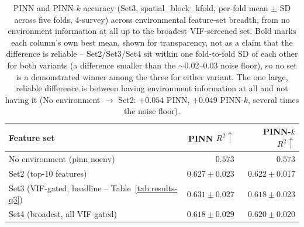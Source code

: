 
\begin{table}[!htbp]
\centering
\small
\setlength{\tabcolsep}{6pt}
\renewcommand{\arraystretch}{1.2}
\begin{tabular}{lrr}
\toprule
Feature set & PINN $R^2{\uparrow}$ & PINN-$k$ $R^2{\uparrow}$ \\
\midrule
No environment ($\text{pinn\_noenv}$) & $0.573$ & $0.573$ \\
Set2 (top-10 features) & $0.627{\pm}0.023$ & $0.622{\pm}0.017$ \\
Set3 (VIF-gated, headline -- Table~\ref{tab:results-q3}) & $\mathbf{0.631{\pm}0.027}$ & $0.618{\pm}0.023$ \\
Set4 (broadest, all VIF-gated) & $0.618{\pm}0.029$ & $\mathbf{0.620{\pm}0.020}$ \\
\bottomrule
\end{tabular}
\caption{\small{PINN and PINN-$k$ accuracy (Set3, spatial\_block\_kfold, per-fold mean $\pm$ SD
across five folds, 4-survey) across environmental feature-set breadth, from no environment
information at all up to the broadest VIF-screened set. Bold marks each column's own best
mean, shown for transparency, not as a claim that the difference is reliable --
Set2/Set3/Set4 sit within one fold-to-fold SD of each other for both variants (a
difference smaller than the $\sim$0.02--0.03 noise floor), so no set is a demonstrated
winner among the three for either variant. The one large, reliable difference is between
having environment information at all and not having it (No environment $\to$ Set2:
$+0.054$ PINN, $+0.049$ PINN-$k$, several times the noise floor).}}
\label{tab:results-q3-env-sweep}
\end{table}


